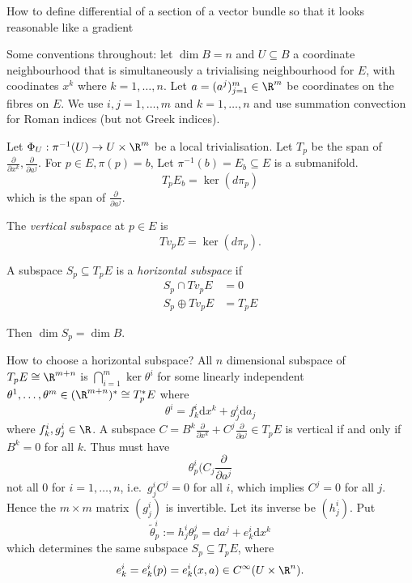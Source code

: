 \documentclass[a4paper]{article}
\begin{document}
How to define differential of a section of a vector bundle so that it looks reasonable like a gradient

Some conventions throughout: let \(\dim B = n\) and \(U \subseteq B\) a coordinate neighbourhood that is simultaneously a trivialising neighbourhood for \(E\), with coodinates \(x^k\) where \(k = 1, \dots, n\). Let \(a = (a^j)_{j = 1}^m \in \R^m\) be coordinates on the fibres on \(E\). We use \(i, j = 1, \dots, m\) and \(k = 1, \dots, n\) and use summation convection for Roman indices (but not Greek indices).

Let \(\Phi_U: \pi^{-1}(U) \to U \times \R^m\) be a local trivialisation. Let \(T_p\) be the span of \(\frac{\partial  }{\partial x^k}, \frac{\partial  }{\partial a^j}\). For \(p \in E, \pi(p) = b\), Let \(\pi^{-1}(b) = E_b \subseteq E\) is a submanifold.
\[
  T_pE_b = \ker (d\pi_p)
\]
which is the span of \(\frac{\partial  }{\partial a^j}\).

\begin{definition}
  The \emph{vertical subspace} at \(p \in E\) is
  \[
    Tv_pE = \ker(d\pi_p).
  \]

  A subspace \(S_p \subseteq T_pE\) is a  \emph{horizontal subspace} if
  \begin{align*}
    S_p \cap Tv_p E &= 0 \\
    S_p \oplus Tv_p E &= T_pE
  \end{align*}
\end{definition}

Then \(\dim S_p = \dim B\).

How to choose a horizontal subspace? All \(n\) dimensional subspace of \(T_pE \cong \R^{m + n}\) is \(\bigcap_{i = 1}^m \ker \theta^i\) for some linearly independent \(\theta^1, \dots, \theta^m \in (\R^{m + n})^* \cong T_p^*E\) where
\[
  \theta^i = f_k^i \mathrm d x^k + g_j^i \mathrm d a_j
\]
where \(f_k^i, g_j^i \in \R\). A subspace \(C = B^k \frac{\partial  }{\partial x^k} + C^j \frac{\partial  }{\partial a^j} \in T_p E\) is vertical if and only if \(B^k = 0\) for all \(k\). Thus must have
\[
  \theta_p^i(C_j \frac{\partial  }{\partial a^j}
\]
not all \(0\) for \(i = 1, \dots, n\), i.e.\ \(g^i_j C^j = 0\) for all \(i\), which implies \(C^j = 0\) for all \(j\). Hence the \(m \times m\) matrix \((g_j^i)\) is invertible. Let its inverse be \((h_j^i)\). Put
\[
  \tilde \theta_p^i := h_j^i \theta_p^j = \mathrm d a^j + e^i_k \mathrm d x^k
\]
which determines the same subspace \(S_p \subseteq T_pE\), where
\[
  e_k^i = e_k^i(p) = e_k^i(x, a) \in C^\infty(U \times \R^n).
\]
\end{document}
